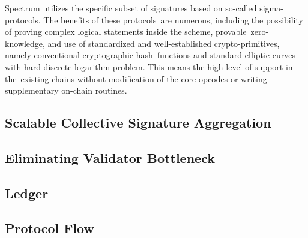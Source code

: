 Spectrum utilizes the specific subset of signatures based on so-called sigma-protocols.
The benefits of these protocols\
are numerous, including the possibility of proving complex logical statements inside the scheme, provable\
zero-knowledge, and use of standardized and well-established crypto-primitives, namely conventional cryptographic hash\
functions and standard elliptic curves with hard discrete logarithm problem.
This means the high level of support in the\
existing chains without modification of the core opcodes or writing supplementary on-chain routines.

\subsection{Scalable Collective Signature Aggregation}\label{subsec:scalable-collective-signature-aggregation}


\subsection{Eliminating Validator Bottleneck}\label{subsec:eliminating-validator-bottleneck}


\subsection{Ledger}\label{subsec:ledger-model}


\subsection{Protocol Flow}\label{subsec:protocol-flow}


